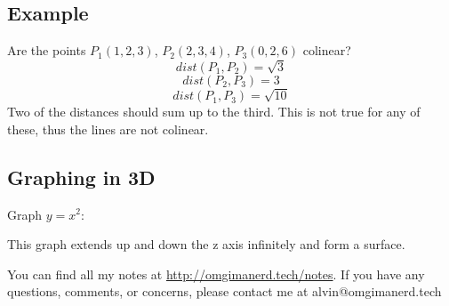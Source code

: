 \documentclass{math}
\begin{document}
\subsection*{Example}
Are the points \( P_{1}(1,2,3) \), \( P_{2}(2,3,4) \), \( P_{3}(0,2,6) \)
colinear?
\[ dist(P_{1},P_{2}) = \sqrt{3} \]
\[ dist(P_{2},P_{3}) = 3 \]
\[ dist(P_{1},P_{3}) = \sqrt{10} \]
Two of the distances should sum up to the third. This is not true for any of
these, thus the lines are not colinear.

\subsection*{Graphing in 3D}
Graph \( y = x^{2} \):
\begin{center}
\end{center}
This graph extends up and down the z axis infinitely and form a surface.

\begin{center}
  You can find all my notes at \url{http://omgimanerd.tech/notes}. If you have
  any questions, comments, or concerns, please contact me at
  alvin@omgimanerd.tech
\end{center}
\end{document}
